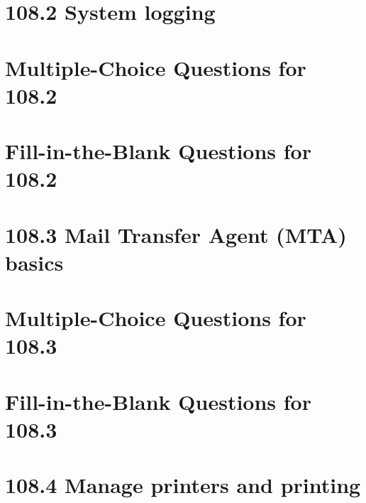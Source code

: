 \documentclass[a4paper]{report}
\begin{document}
\section*{108.2 System logging}

\newpage
\section*{Multiple-Choice Questions for 108.2}

\newpage
\section*{Fill-in-the-Blank Questions for 108.2}

\newpage
\section*{108.3 Mail Transfer Agent (MTA) basics}

\newpage
\section*{Multiple-Choice Questions for 108.3}

\newpage
\section*{Fill-in-the-Blank Questions for 108.3}

\newpage
\section*{108.4 Manage printers and printing}
\end{document}
